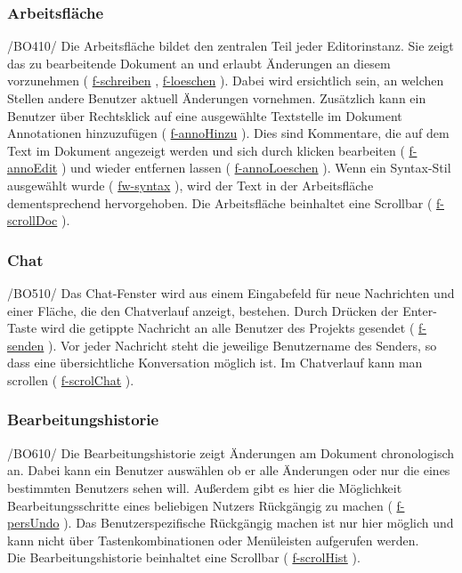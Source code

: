 \documentclass{scrartcl}
\newcommand{\refFunction}[1]{%
  \hyperlink{#1}{\csname #1\endcsname}%
  }
\begin{document}
\subsubsection{Arbeitsfläche}
\label{subsubsec:arbeitsflaeche}
/BO410/ Die Arbeitsfläche bildet den zentralen Teil jeder Editorinstanz. Sie zeigt das zu bearbeitende Dokument an und erlaubt Änderungen an diesem vorzunehmen (\refFunction{f-schreiben}, \refFunction{f-loeschen}). Dabei wird ersichtlich sein, an welchen Stellen andere Benutzer aktuell Änderungen vornehmen.
Zusätzlich kann ein Benutzer über Rechtsklick auf eine ausgewählte Textstelle im Dokument Annotationen hinzuzufügen (\refFunction{f-annoHinzu}). Dies sind Kommentare, die auf dem Text im Dokument angezeigt werden und sich durch klicken  bearbeiten (\refFunction{f-annoEdit}) und wieder entfernen lassen (\refFunction{f-annoLoeschen}).
Wenn ein Syntax-Stil ausgewählt wurde (\refFunction{fw-syntax}), wird der Text in der Arbeitsfläche dementsprechend hervorgehoben. Die Arbeitsfläche beinhaltet eine Scrollbar (\refFunction{f-scrollDoc}).

\subsubsection{Chat}
\label{subsubsec:chat}
/BO510/ Das Chat-Fenster
wird aus einem Eingabefeld für neue Nachrichten und einer Fläche, die den Chatverlauf anzeigt, bestehen. 
Durch Drücken der Enter-Taste wird die getippte Nachricht an alle Benutzer des Projekts gesendet (\refFunction{f-senden}). Vor jeder Nachricht steht die jeweilige Benutzername des Senders, so dass eine übersichtliche Konversation möglich ist. Im Chatverlauf kann man scrollen (\refFunction{f-scrolChat}).

\subsubsection{Bearbeitungshistorie}
\label{subsubsec:historie}
/BO610/ Die Bearbeitungshistorie zeigt Änderungen am Dokument chronologisch an. Dabei kann ein Benutzer auswählen ob er alle Änderungen oder nur die eines bestimmten Benutzers sehen will. Außerdem gibt es hier die Möglichkeit Bearbeitungsschritte eines beliebigen Nutzers Rückgängig zu machen (\refFunction{f-persUndo}). Das Benutzerspezifische Rückgängig machen ist nur hier möglich und kann nicht über Tastenkombinationen oder Menüleisten aufgerufen werden. \\
Die Bearbeitungshistorie beinhaltet eine Scrollbar (\refFunction{f-scrolHist}).
\end{document}

